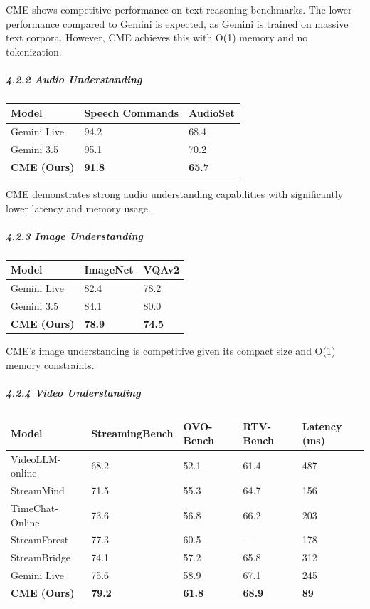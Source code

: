 \documentclass[
  11pt,
  a4paper,
]{article}
\begin{document}
CME shows competitive performance on text reasoning benchmarks. The
lower performance compared to Gemini is expected, as Gemini is trained
on massive text corpora. However, CME achieves this with O(1) memory and
no tokenization.

\subparagraph{4.2.2 Audio Understanding}\label{audio-understanding}

\begin{longtable}[]{@{}lll@{}}
\toprule\noalign{}
Model & Speech Commands & AudioSet \\
\midrule\noalign{}
\endhead
\bottomrule\noalign{}
\endlastfoot
Gemini Live & 94.2 & 68.4 \\
Gemini 3.5 & 95.1 & 70.2 \\
\textbf{CME (Ours)} & \textbf{91.8} & \textbf{65.7} \\
\end{longtable}

CME demonstrates strong audio understanding capabilities with
significantly lower latency and memory usage.

\subparagraph{4.2.3 Image Understanding}\label{image-understanding}

\begin{longtable}[]{@{}lll@{}}
\toprule\noalign{}
Model & ImageNet & VQAv2 \\
\midrule\noalign{}
\endhead
\bottomrule\noalign{}
\endlastfoot
Gemini Live & 82.4 & 78.2 \\
Gemini 3.5 & 84.1 & 80.0 \\
\textbf{CME (Ours)} & \textbf{78.9} & \textbf{74.5} \\
\end{longtable}

CME's image understanding is competitive given its compact size and O(1)
memory constraints.

\subparagraph{4.2.4 Video Understanding}\label{video-understanding}

\begin{longtable}[]{@{}lllll@{}}
\toprule\noalign{}
Model & StreamingBench & OVO-Bench & RTV-Bench & Latency (ms) \\
\midrule\noalign{}
\endhead
\bottomrule\noalign{}
\endlastfoot
VideoLLM-online & 68.2 & 52.1 & 61.4 & 487 \\
StreamMind & 71.5 & 55.3 & 64.7 & 156 \\
TimeChat-Online & 73.6 & 56.8 & 66.2 & 203 \\
StreamForest & 77.3 & 60.5 & --- & 178 \\
StreamBridge & 74.1 & 57.2 & 65.8 & 312 \\
Gemini Live & 75.6 & 58.9 & 67.1 & 245 \\
\textbf{CME (Ours)} & \textbf{79.2} & \textbf{61.8} & \textbf{68.9} &
\textbf{89} \\
\end{longtable}
\end{document}
